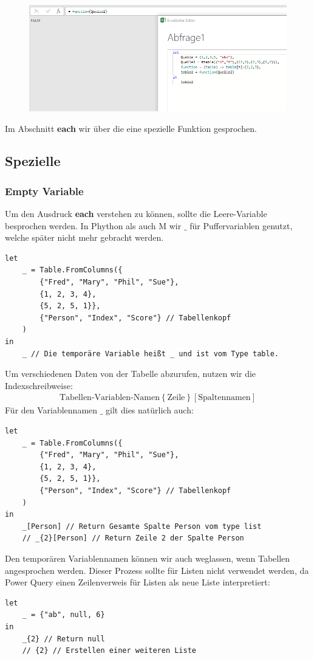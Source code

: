 \begin{figure}[H]
	\centering
	\includegraphics[scale = 0.3]{attachment/chapter_1/screenshot038}
	\caption{}
	\label{fig:screenshot038}
\end{figure}
Im Abschnitt \textbf{each} wir über die eine spezielle Funktion gesprochen. 
\subsection{Spezielle}
\subsubsection{Empty Variable}
Um den Ausdruck \textbf{each} verstehen zu können, sollte die Leere-Variable besprochen werden. In Phython als auch M wir $\_$ für Puffervariablen genutzt, welche später nicht mehr gebracht werden. 
\begin{lstlisting}[style=M]
let
	_ = Table.FromColumns({
		{"Fred", "Mary", "Phil", "Sue"},
		{1, 2, 3, 4},
		{5, 2, 5, 1}},
		{"Person", "Index", "Score"} // Tabellenkopf
	)
in
	_ // Die temporäre Variable heißt _ und ist vom Type table.
\end{lstlisting}

Um verschiedenen Daten von der Tabelle abzurufen, nutzen wir die Indexschreibweise:
\begin{align} 
	\text{Tabellen-Variablen-Namen}\left\lbrace\text{Zeile} \right\rbrace \left[\text{Spaltennamen}\right]
\end{align} 
Für den Variablennamen $\_$ gilt dies natürlich auch:
 \begin{lstlisting}[style=M]
let
	_ = Table.FromColumns({
		{"Fred", "Mary", "Phil", "Sue"},
		{1, 2, 3, 4},
		{5, 2, 5, 1}},
		{"Person", "Index", "Score"} // Tabellenkopf
	)
in
	_[Person] // Return Gesamte Spalte Person vom type list
	// _{2}[Person] // Return Zeile 2 der Spalte Person
\end{lstlisting}
Den temporären Variablennamen können wir auch weglassen, wenn Tabellen angesprochen werden. Dieser Prozess sollte für Listen nicht verwendet werden, da Power Query einen Zeilenverweis für Listen als neue Liste interpretiert:
 \begin{lstlisting}[style=M]
let
	_ = {"ab", null, 6}
in
	_{2} // Return null
	// {2} // Erstellen einer weiteren Liste
\end{lstlisting}

